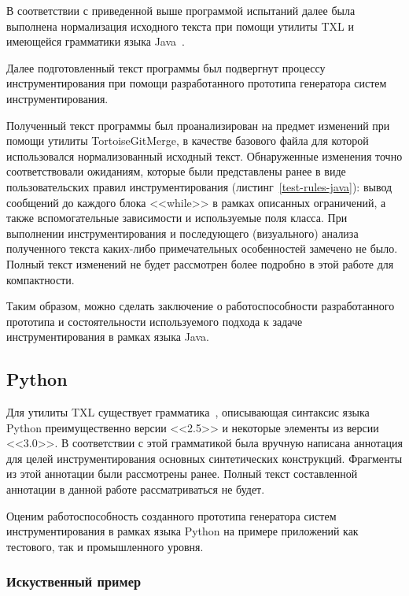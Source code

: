 В соответствии с приведенной выше программой испытаний далее была выполнена нормализация исходного текста при помощи утилиты TXL и имеющейся грамматики языка Java~\cite{txl-resources}.

Далее подготовленный текст программы был подвергнут процессу инструментирования при помощи разработанного прототипа генератора систем инструментирования.

Полученный текст программы был проанализирован на предмет изменений при помощи утилиты TortoiseGitMerge, в качестве базового файла для которой использовался нормализованный исходный текст.
Обнаруженные изменения точно соответствовали ожиданиям, которые были представлены ранее в виде пользовательских правил инструментирования (листинг~\ref{test-rules-java}):
вывод сообщений до каждого блока <<while>> в рамках описанных ограничений,
а также вспомогательные зависимости и используемые поля класса.
При выполнении инструментирования и последующего (визуального) анализа полученного текста каких-либо примечательных особенностей замечено не было.
Полный текст изменений не будет рассмотрен более подробно в этой работе для компактности.

Таким образом, можно сделать заключение о работоспособности разработанного прототипа и состоятельности используемого подхода к задаче инструментирования в рамках языка Java.

\subsection{Python}

Для утилиты TXL существует грамматика~\cite{txl-resources}, описывающая синтаксис языка Python преимущественно версии <<2.5>> и некоторые элементы из версии <<3.0>>.
В соответствии с этой грамматикой была вручную написана аннотация для целей инструментирования основных синтетических конструкций.
Фрагменты из этой аннотации были рассмотрены ранее.
Полный текст составленной аннотации в данной работе рассматриваться не будет.

Оценим работоспособность созданного прототипа генератора систем инструментирования в рамках языка Python на примере приложений как тестового, так и промышленного уровня.

\subsubsection{Искуственный пример}


